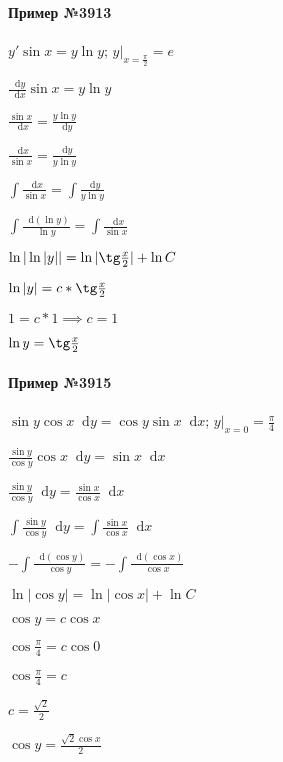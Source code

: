 \documentclass{article}
\newcommand*\diff{\mathop{}\!\mathrm{d}}
\begin{document}
\begin{minipage}{0.49\textwidth}
    \paragraph{Пример №3913}
    $y' \sin x = y \ln y$; $y \bigg|_{x = \frac{\pi}{2}} = e$

    $\frac{\diff y}{\diff x} \sin x = y \ln y$

    $\frac{\sin x}{\diff x} = \frac{y \ln y}{\diff y}$

    $\frac{\diff x}{\sin x} = \frac{\diff y}{y \ln y}$
    
    $\int \frac{\diff x}{\sin x} = \int \frac{\diff y}{y \ln y}$

    $\int \frac{\diff(\ln y)}{\ln y} = \int \frac{\diff x}{\sin x}$

    $\ln |\ln |y|| = \ln | \tg \frac{x}{2}| + \ln C$
    
    $\ln |y| = c * \tg \frac{x}{2}$

    $1 = c * 1 \implies c = 1$

    $\ln y =  \tg \frac{x}{2}$

    \paragraph{Пример №3915} $\sin y \cos x \diff y = \cos y \sin x \diff x$; $y \bigg|_{x = 0} = \frac{\pi}{4}$

    $\frac{\sin y}{\cos y} \cos x \diff y = \sin x \diff x$

    $\frac{\sin y}{\cos y} \diff y = \frac{\sin x}{\cos x} \diff x$

    $\int \frac{\sin y}{\cos y} \diff y = \int \frac{\sin x}{\cos x} \diff x$

    $- \int \frac{\diff (\cos y)}{\cos y} = - \int \frac{\diff (\cos x)}{\cos x}$

    $\ln |\cos y| = \ln |\cos x| + \ln C$

    $\cos y = c \cos x$

    $\cos \frac{\pi}{4} = c \cos 0$

    $\cos \frac{\pi}{4} = c$

    $c = \frac{\sqrt{2}}{2}$

    $\cos y = \frac{\sqrt{2} \cos x}{2}$
\end{minipage}
\end{document}
